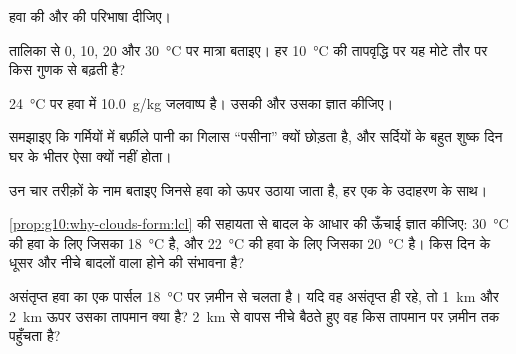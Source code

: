 \begin{exercise}[$\star$]\label{exo:g10:why-clouds-form:1}
हवा की  और  की परिभाषा दीजिए।
\end{exercise}

\begin{exercise}[$\star$]\label{exo:g10:why-clouds-form:2}
तालिका से \num{0}, \num{10},
\num{20} और \qty{30}{\degreeCelsius} पर  मात्रा बताइए। हर \qty{10}{\degreeCelsius}
की तापवृद्धि पर यह मोटे तौर पर किस गुणक से बढ़ती है?
\end{exercise}

\begin{exercise}[$\star$]\label{exo:g10:why-clouds-form:3}
\qty{24}{\degreeCelsius} पर हवा में \qty{10.0}{g/kg} जलवाष्प है।
उसकी  और उसका  ज्ञात कीजिए।
\end{exercise}

\begin{exercise}[$\star$]\label{exo:g10:why-clouds-form:4}
समझाइए कि गर्मियों में बर्फ़ीले पानी का गिलास ``पसीना'' क्यों छोड़ता है, और सर्दियों के बहुत
शुष्क दिन घर के भीतर ऐसा क्यों नहीं होता।
\end{exercise}

\begin{exercise}[$\star$]\label{exo:g10:why-clouds-form:5}
उन चार तरीक़ों के नाम बताइए जिनसे हवा को ऊपर उठाया जाता है, हर एक के उदाहरण के साथ।
\end{exercise}

\begin{exercise}[$\star\star$]\label{exo:g10:why-clouds-form:6}
\cref{prop:g10:why-clouds-form:lcl} की सहायता से बादल के आधार की ऊँचाई ज्ञात कीजिए:
\qty{30}{\degreeCelsius} की हवा के लिए जिसका 
\qty{18}{\degreeCelsius} है, और \qty{22}{\degreeCelsius} की हवा के लिए जिसका
 \qty{20}{\degreeCelsius} है। किस दिन के धूसर और नीचे बादलों वाला होने की संभावना है?
\end{exercise}

\begin{exercise}[$\star\star$]\label{exo:g10:why-clouds-form:7}
असंतृप्त हवा का एक पार्सल \qty{18}{\degreeCelsius} पर ज़मीन से चलता है।
यदि वह असंतृप्त ही रहे, तो \qty{1}{km} और \qty{2}{km} ऊपर उसका तापमान क्या है?
\qty{2}{km} से वापस नीचे बैठते हुए वह किस तापमान पर
ज़मीन तक पहुँचता है?
\end{exercise}

